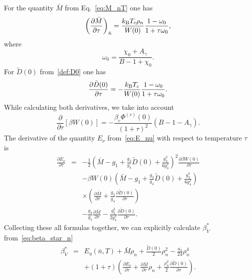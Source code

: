 \documentclass[12pt]{article}
\begin{document}
	For the quantity $\bar{M}$ from Eq.~\eqref{eq:M_nT} one has
	\begin{equation}
		\left( \frac{\partial \bar{M}}{\partial \tau} \right)_{\bar{n}} =
		\frac{k_{\rm B}T_c \rho_n}{W(0)} \frac{1 - \omega_0}{1 + \tau\omega_0},
	\end{equation}
	where
	\begin{equation*}
		\omega_0 = \frac{\chi_0 + A_{\gamma}}{B - 1 + \chi_0}.
	\end{equation*}
	For $\tilde{D}(0)$ from~\eqref{def:D0} one has
	\begin{equation}
		\frac{\partial \tilde{D}(0)}{\partial \tau} = -\frac{k_{\rm B}T_c}{W(0)} \frac{1 - \omega_0}{1 + \tau \omega_0}.
	\end{equation}
	While calculating both derivatives, we take into account
	\begin{equation}
		\frac{\partial}{\partial \tau} \left[\beta W(0)\right] = -\frac{\beta_c \Phi^{(r)}(0)}{(1+\tau)^2} (B - 1 - A_{\gamma}).
	\end{equation}
	The derivative of the quantity $E_\nu$ from~\eqref{eq:E_nu} with respect to temperature $\tau$ is
	\begin{eqnarray}
		\frac{\partial E_\nu}{\partial \tau} & = &  -\frac{1}{2}\left(\bar{M} - g_1 + \frac{g_3}{g_4} \tilde{D}(0) + \frac{g_3^3}{6g_4^2} \right)^{2} 
		\frac{\partial \beta W(0)}{\partial \tau} 
		\nonumber\\
		&&-\beta W(0)\left(\bar{M} - g_1 + \frac{g_3}{g_4} \tilde{D}(0) + \frac{g_3^3}{6g_4^2} \right)
		\nonumber\\
		&& \times \left(\frac{\partial \bar{M}}{\partial \tau} + \frac{g_3}{g_4}\frac{\partial\tilde{D}(0)}{\partial \tau}\right)
		\nonumber\\
		&& -\frac{g_3}{g_4}\frac{\partial \bar{M}}{\partial \tau} 
		- \frac{g_3^2}{2g_4^2}\frac{\partial \tilde{D}(0)}{\partial \tau}.
	\end{eqnarray}
	Collecting these all formulas together, we can explicitly calculate $\beta^*_V$ from~\eqref{eq:beta_star_n}
	\begin{eqnarray}
		\beta^*_V & = & E_\eta (\bar{n},T) + \bar{M} \rho_{n} + \frac{\tilde D(0)}{2} \rho_{n}^2 - \frac{a_4}{24} \rho_{n}^4
		\nonumber\\
		&& + (1+\tau) \left(\frac{\partial E_{\nu}}{\partial \tau} + \frac{\partial \bar{M}}{\partial \tau}\rho_{n} + \frac{\rho_n^2}{2}\frac{\partial \tilde{D}(0)}{\partial \tau}\right).
	\end{eqnarray}
	
	
	
	
	
\end{document}
